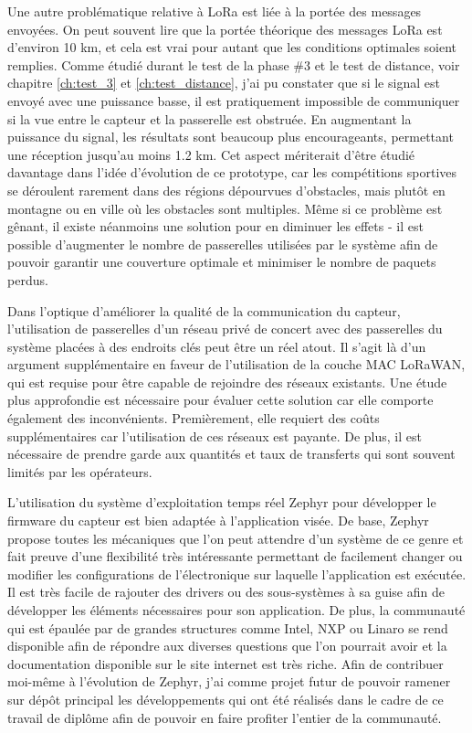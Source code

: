 Une autre problématique relative à LoRa est liée à la portée des messages envoyées. On peut souvent lire que la portée théorique des messages LoRa est d'environ 10 km, et cela est vrai pour autant que les conditions optimales soient remplies. Comme étudié durant le test de la phase \#3 et le test de distance, voir chapitre \ref{ch:test_3} et \ref{ch:test_distance}, j'ai pu constater que si le signal est envoyé avec une puissance basse, il est pratiquement impossible de communiquer si la vue entre le capteur et la passerelle est obstruée. En augmentant la puissance du signal, les résultats sont beaucoup plus encourageants, permettant une réception jusqu'au moins 1.2 km. Cet aspect mériterait d'être étudié davantage dans l'idée d'évolution de ce prototype, car les compétitions sportives se déroulent rarement dans des régions dépourvues d'obstacles, mais plutôt en montagne ou en ville où les obstacles sont multiples. Même si ce problème est gênant, il existe néanmoins une solution pour en diminuer les effets - il est possible d'augmenter le nombre de passerelles utilisées par le système afin de pouvoir garantir une couverture optimale et minimiser le nombre de paquets perdus. 

Dans l'optique d'améliorer la qualité de la communication du capteur, l'utilisation de passerelles d'un réseau privé de concert avec des passerelles du système placées à des endroits clés peut être un réel atout. Il s’agit là d’un argument supplémentaire en faveur de l'utilisation de la couche MAC LoRaWAN, qui est requise pour être capable de rejoindre des réseaux existants. Une étude plus approfondie est nécessaire pour évaluer cette solution car elle comporte également des inconvénients. Premièrement, elle requiert des coûts supplémentaires car l'utilisation de ces réseaux est payante. De plus, il est nécessaire de prendre garde aux quantités et taux de transferts qui sont souvent limités par les opérateurs.

L'utilisation du système d'exploitation temps réel Zephyr pour développer le firmware du capteur est bien adaptée à l'application visée. De base, Zephyr propose toutes les mécaniques que l'on peut attendre d'un système de ce genre et fait preuve d’une flexibilité très intéressante permettant de facilement changer ou modifier les configurations de l'électronique sur laquelle l'application est exécutée. Il est très facile de rajouter des drivers ou des sous-systèmes à sa guise afin de développer les éléments nécessaires pour son application. De plus, la communauté qui est épaulée par de grandes structures comme Intel, NXP ou Linaro se rend disponible afin de répondre aux diverses questions que l'on pourrait avoir et la documentation disponible sur le site internet est très riche. Afin de contribuer moi-même à l'évolution de Zephyr, j'ai comme projet futur de pouvoir ramener sur dépôt principal les développements qui ont été réalisés dans le cadre de ce travail de diplôme afin de pouvoir en faire profiter l'entier de la communauté.

